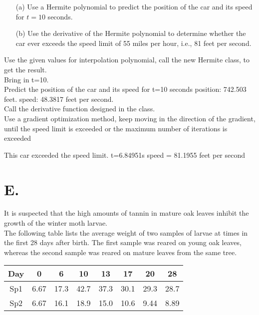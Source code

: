 \documentclass[a4paper]{article}
\begin{document}
    \begin{enumerate}
        \item[(a)] Use a Hermite polynomial to predict the position of the car and its speed for $t = 10$ seconds.
        \item[(b)] Use the derivative of the Hermite polynomial to determine whether the car ever exceeds the speed limit of 55 miles per hour, i.e., 81 feet per second.
    \end{enumerate}
    Use the given values for interpolation polynomial, call the new Hermite class, to get the result. \\
    Bring in t=10.\\
    
    Predict the position of the car and its speed for t=10 seconds
    position: 742.503 feet. speed: 48.3817 feet per second. \\
    Call the derivative function designed in the class.\\
    
    Use a gradient optimization method, keep moving in the direction of the gradient, until the speed limit is exceeded or the maximum number of iterations is exceeded
    
    This car exceeded the speed limit.
    t=6.84951s speed = 81.1955 feet per second
    
    
    \section*{E.}
    It is suspected that the high amounts of tannin in mature oak leaves inhibit the growth of the winter moth larvae.\\
    
    The following table lists the average weight of two samples of larvae at times in the first 28 days after birth. The first sample was reared on young oak leaves, whereas the second sample was reared on mature leaves from the same tree.
    
    \begin{table}[H]
        \centering
        \begin{tabular}{@{}cccccccc@{}}
            \toprule
            Day & 0 & 6 & 10 & 13 & 17 & 20 & 28 \\ \midrule
            Sp1 & 6.67 & 17.3 & 42.7 & 37.3 & 30.1 & 29.3 & 28.7 \\
            Sp2 & 6.67 & 16.1 & 18.9 & 15.0 & 10.6 & 9.44 & 8.89 \\ \bottomrule
        \end{tabular}
    \end{table}
    
\end{document}
